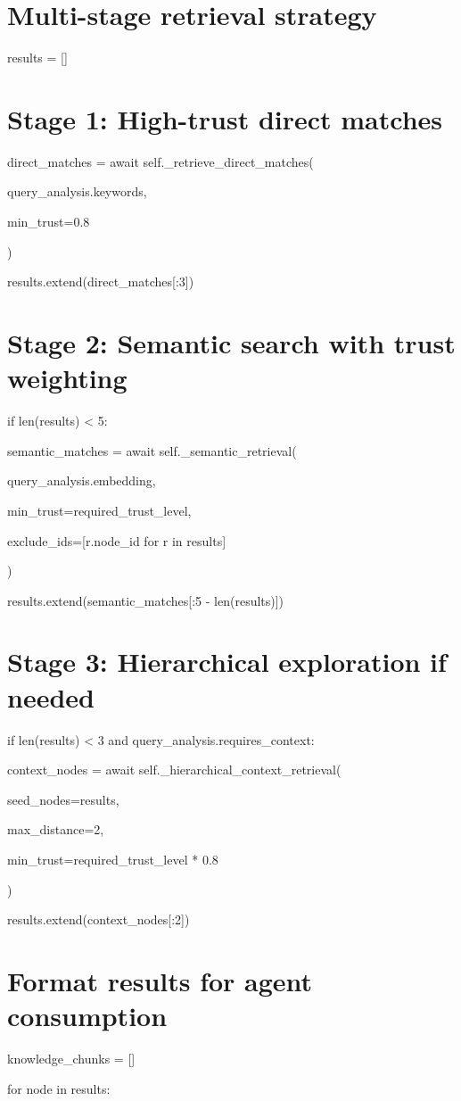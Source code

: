 \documentclass[a4paper,11pt]{article}
\begin{document}
\section{Multi-stage retrieval strategy}
results = []


\section{Stage 1: High-trust direct matches}
direct\_matches = await self.\_retrieve\_direct\_matches(

query\_analysis.keywords,

min\_trust=0.8

)

results.extend(direct\_matches[:3])


\section{Stage 2: Semantic search with trust weighting}
if len(results) < 5:

semantic\_matches = await self.\_semantic\_retrieval(

query\_analysis.embedding,

min\_trust=required\_trust\_level,

exclude\_ids=[r.node\_id for r in results]

)

results.extend(semantic\_matches[:5 - len(results)])


\section{Stage 3: Hierarchical exploration if needed}
if len(results) < 3 and query\_analysis.requires\_context:

context\_nodes = await self.\_hierarchical\_context\_retrieval(

seed\_nodes=results,

max\_distance=2,

min\_trust=required\_trust\_level * 0.8

)

results.extend(context\_nodes[:2])


\section{Format results for agent consumption}
knowledge\_chunks = []

for node in results:
\end{document}
